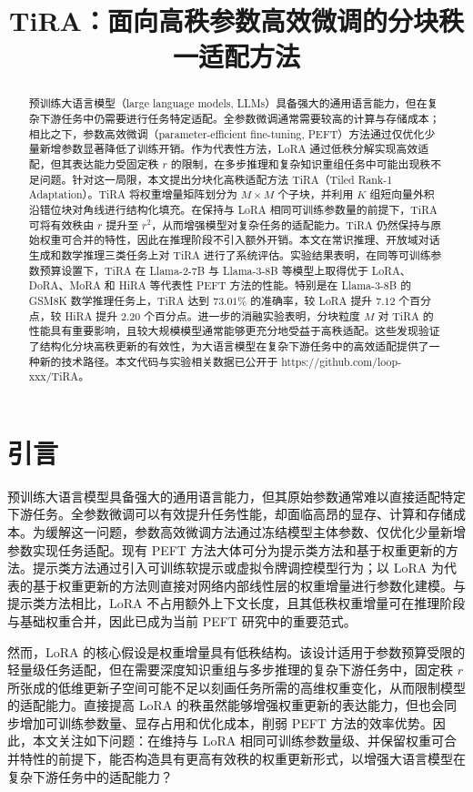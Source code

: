 \documentclass[UTF8,a4paper,11pt]{ctexart}
\title{TiRA：面向高秩参数高效微调的分块秩一适配方法}
\author{}
\date{}
\begin{document}
\pagestyle{empty}
\maketitle

\begin{abstract}
预训练大语言模型（large language models, LLMs）具备强大的通用语言能力，但在复杂下游任务中仍需要进行任务特定适配。全参数微调通常需要较高的计算与存储成本；相比之下，参数高效微调（parameter-efficient fine-tuning, PEFT）方法通过仅优化少量新增参数显著降低了训练开销。作为代表性方法，LoRA 通过低秩分解实现高效适配，但其表达能力受固定秩 $r$ 的限制，在多步推理和复杂知识重组任务中可能出现秩不足问题。针对这一局限，本文提出分块化高秩适配方法 TiRA（Tiled Rank-1 Adaptation）。TiRA 将权重增量矩阵划分为 $M\times M$ 个子块，并利用 $K$ 组短向量外积沿错位块对角线进行结构化填充。在保持与 LoRA 相同可训练参数量的前提下，TiRA 可将有效秩由 $r$ 提升至 $r^2$，从而增强模型对复杂任务的适配能力。TiRA 仍然保持与原始权重可合并的特性，因此在推理阶段不引入额外开销。本文在常识推理、开放域对话生成和数学推理三类任务上对 TiRA 进行了系统评估。实验结果表明，在同等可训练参数预算设置下，TiRA 在 Llama-2-7B 与 Llama-3-8B 等模型上取得优于 LoRA、DoRA、MoRA 和 HiRA 等代表性 PEFT 方法的性能。特别是在 Llama-3-8B 的 GSM8K 数学推理任务上，TiRA 达到 $73.01\%$ 的准确率，较 LoRA 提升 $7.12$ 个百分点，较 HiRA 提升 $2.20$ 个百分点。进一步的消融实验表明，分块粒度 $M$ 对 TiRA 的性能具有重要影响，且较大规模模型通常能够更充分地受益于高秩适配。这些发现验证了结构化分块高秩更新的有效性，为大语言模型在复杂下游任务中的高效适配提供了一种新的技术路径。本文代码与实验相关数据已公开于 https://github.com/loop-xxx/TiRA。
\end{abstract}

\section{引言}

预训练大语言模型具备强大的通用语言能力，但其原始参数通常难以直接适配特定下游任务。全参数微调可以有效提升任务性能，却面临高昂的显存、计算和存储成本。为缓解这一问题，参数高效微调方法通过冻结模型主体参数、仅优化少量新增参数实现任务适配。现有 PEFT 方法大体可分为提示类方法和基于权重更新的方法。提示类方法通过引入可训练软提示或虚拟令牌调控模型行为；以 LoRA\cite{hu2022lora} 为代表的基于权重更新的方法则直接对网络内部线性层的权重增量进行参数化建模。与提示类方法相比，LoRA 不占用额外上下文长度，且其低秩权重增量可在推理阶段与基础权重合并，因此已成为当前 PEFT 研究中的重要范式。

然而，LoRA 的核心假设是权重增量具有低秩结构。该设计适用于参数预算受限的轻量级任务适配，但在需要深度知识重组与多步推理的复杂下游任务中，固定秩 $r$ 所张成的低维更新子空间可能不足以刻画任务所需的高维权重变化，从而限制模型的适配能力。直接提高 LoRA 的秩虽然能够增强权重更新的表达能力，但也会同步增加可训练参数量、显存占用和优化成本，削弱 PEFT 方法的效率优势。因此，本文关注如下问题：在维持与 LoRA 相同可训练参数量级、并保留权重可合并特性的前提下，能否构造具有更高有效秩的权重更新形式，以增强大语言模型在复杂下游任务中的适配能力？
\end{document}
